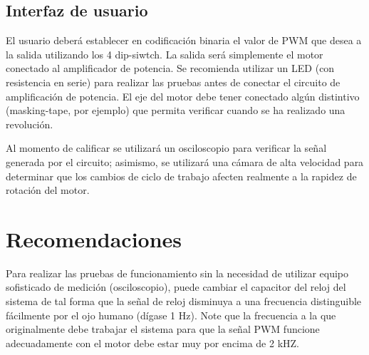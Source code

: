 \subsection{Interfaz de usuario}
El usuario deberá establecer en codificación binaria el valor de PWM que desea a la salida utilizando los 4 dip-siwtch. La salida será simplemente
el motor conectado al amplificador de potencia. Se recomienda utilizar un LED (con resistencia en serie) para realizar las pruebas antes de conectar 
el circuito de amplificación de potencia.  El eje del motor debe tener conectado algún distintivo (masking-tape, por ejemplo) que permita verificar 
cuando se ha realizado una revolución.

Al momento de calificar se utilizará un osciloscopio para verificar la señal generada por el circuito; asimismo, se utilizará una cámara de alta velocidad
para determinar que los cambios de ciclo de trabajo afecten realmente a la rapidez de rotación del motor.

\section{Recomendaciones}
Para realizar las pruebas de funcionamiento sin la necesidad de utilizar equipo sofisticado de medición (osciloscopio), puede cambiar el capacitor del reloj del sistema
de tal forma que la señal de reloj disminuya a una frecuencia distinguible fácilmente por el ojo humano (dígase 1 Hz). Note que la frecuencia a la que originalmente
debe trabajar el sistema para que la señal PWM funcione adecuadamente con el motor debe estar muy por encima de 2 kHZ.